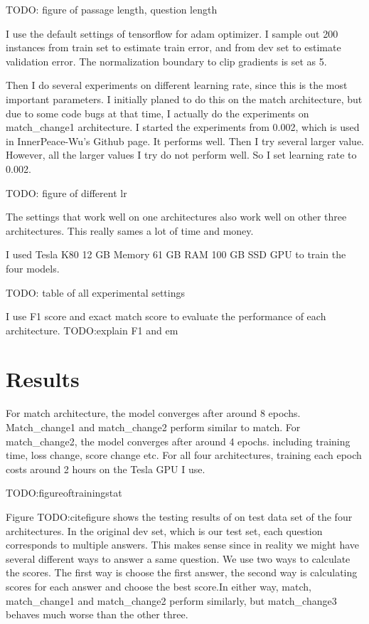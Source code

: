 \documentclass[modernstyle,12pt]{sjsuthesis}
\theoremstyle{definition}
\begin{document}
TODO: figure of passage length, question length

I use the default settings of tensorflow for adam optimizer. I sample out 200 instances from train set to estimate train error, and from dev set to estimate validation error. The normalization boundary to clip gradients is set as 5.

Then I do several experiments on different learning rate, since this is the most important parameters. I initially planed to do this on the match architecture, but due to some code bugs at that time, I actually do the experiments on match\_change1 architecture. I started the experiments from 0.002, which is used in InnerPeace-Wu's Github page. It performs well. Then I try several larger value. However, all the larger values I try do not perform well. So I set learning rate to 0.002.

TODO: figure of different lr


The settings that work well on one architectures also work well on other three architectures. This really sames a lot of time and money.

I used Tesla K80 12 GB Memory 61 GB RAM 100 GB SSD GPU to train the four models.

TODO: table of all experimental settings

I use F1 score and exact match score to evaluate the performance of each architecture. TODO:explain F1 and em


\section{Results}

For match architecture, the model converges after around 8 epochs. Match\_change1 and match\_change2 perform similar to match. For match\_change2, the model converges after around 4 epochs.  including training time, loss change, score change etc. For all four architectures, training each epoch costs around 2 hours on the Tesla GPU I use.

TODO:figureoftrainingstat

Figure TODO:citefigure shows the testing results of on test data set of the four architectures. In the original dev set, which is our test set, each question corresponds to multiple answers. This makes sense since in reality we might have several different ways to answer a same question. We use two ways to calculate the scores. The first way is choose the first answer, the second way is calculating scores for each answer and choose the best score.In either way, match, match\_change1 and match\_change2 perform similarly, but match\_change3 behaves much worse than the other three.
\end{document}
